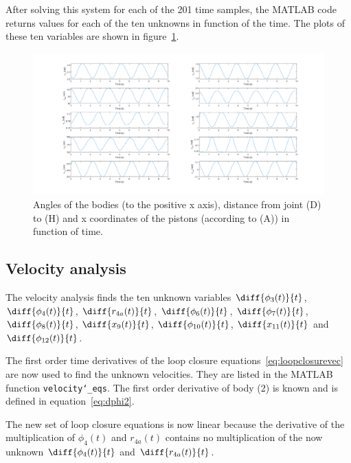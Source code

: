 \documentclass[a4paper]{article}
\begin{document}
After solving this system for each of the 201 time samples, the MATLAB code returns values for each of the ten unknowns in function of the time. The plots of these ten variables are shown in figure~\ref{fig:kinpos}.

\begin{figure}[h]
	\centering
	
	\includegraphics[width = \textwidth]{kinpos.png}
	
	\caption{Angles of the bodies (to the positive x axis), distance from joint (D) to (H) and x coordinates of the pistons (according to (A)) in function of time.}
	\label{fig:kinpos}
	
\end{figure}



\subsection{Velocity analysis}

The velocity analysis finds the ten unknown variables \(\diff{\phi_3(t)}{t}\), \(\diff{\phi_4(t)}{t}\), \(\diff{r_{4a}(t)}{t}\), \(\diff{\phi_6(t)}{t}\), \(\diff{\phi_7(t)}{t}\), \(\diff{\phi_8(t)}{t}\), \(\diff{x_9(t)}{t}\), \(\diff{\phi_{10}(t)}{t}\), \(\diff{x_{11}(t)}{t}\) and \(\diff{\phi_{12}(t)}{t}\).

The first order time derivatives of the loop closure equations~\ref{eq:loopclosurevec} are now used to find the unknown velocities. They are listed in the MATLAB function \texttt{velocity\char`_eqs}. The first order derivative of body (2) is known and is defined in equation~\ref{eq:dphi2}. 

The new set of loop closure equations is now linear because the derivative of the multiplication of \(\phi_4(t)\) and \(r_{4a}(t)\) contains no multiplication of the now unknown \(\diff{\phi_4(t)}{t}\) and \(\diff{r_{4a}(t)}{t}\).
\end{document}
